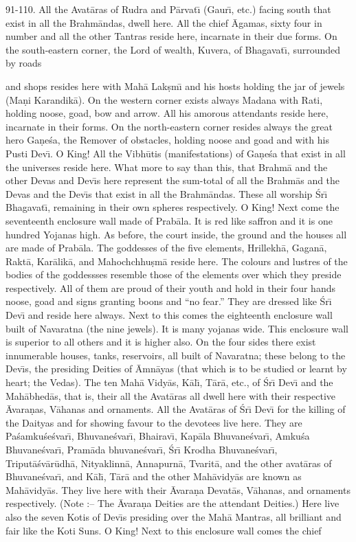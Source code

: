 91-110. All the Avat\=aras of Rudra and P\=arvat\={\i} (Gaur\={\i}, etc.) facing south that exist in all the Brahm\=andas, dwell here. All the chief \=Agamas, sixty four in number and all the other Tantras reside here, incarnate in their due forms. On the south-eastern corner, the Lord of wealth, Kuvera, of Bhagavat\={\i}, surrounded by roads

and shops resides here with Mah\=a Lak\d{s}m\={\i} and his hosts holding the jar of jewels (Ma\d{n}i Karandik\=a). On the western corner exists always Madana with Rati, holding noose, goad, bow and arrow. All his amorous attendants reside here, incarnate in their forms. On the north-eastern corner resides always the great hero Ga\d{n}e\'sa, the Remover of obstacles, holding noose and goad and with his Pusti Dev\={\i}. O King! All the Vibh\=utis (manifestations) of Ga\d{n}e\'sa that exist in all the universes reside here. What more to say than this, that Brahm\=a and the other Devas and Dev\={\i}s here represent the sum-total of all the Brahm\=as and the Devas and the Dev\={\i}s that exist in all the Brahm\=andas. These all worship \'Sr\={\i} Bhagavat\={\i}, remaining in their own spheres respectively. O King! Next come the seventeenth enclosure wall made of Prab\=ala. It is red like saffron and it is one hundred Yojanas high. As before, the court inside, the ground and the houses all are made of Prab\=ala. The goddesses of the five elements, Hrillekh\=a, Gagan\=a, Rakt\=a, Kar\=alik\=a, and Mahochchhu\d{s}m\=a reside here. The colours and lustres of the bodies of the goddessses resemble those of the elements over which they preside respectively. All of them are proud of their youth and hold in their four hands noose, goad and signs granting boons and ``no fear.'' They are dressed like \'Sr\={\i} Dev\={\i} and reside here always. Next to this comes the eighteenth enclosure wall built of Navaratna (the nine jewels). It is many yojanas wide. This enclosure wall is superior to all others and it is higher also. On the four sides there exist innumerable houses, tanks, reservoirs, all built of Navaratna; these belong to the Dev\={\i}s, the presiding Deities of \=Amn\=ayas (that which is to be studied or learnt by heart; the Vedas). The ten Mah\=a Vidy\=as, K\=al\={\i}, T\=ar\=a, etc., of \'Sr\={\i} Dev\={\i} and the Mah\=abhed\=as, that is, their all the Avat\=aras all dwell here with their respective \=Avara\d{n}as, V\=ahanas and ornaments. All the Avat\=aras of \'Sr\={\i} Dev\={\i} for the killing of the Daityas and for showing favour to the devotees live here. They are Pa\'samku\'se\'svar\={\i}, Bhuvane\'svar\={\i}, Bhairav\={\i}, Kap\=ala Bhuvane\'svar\={\i}, Amku\'sa Bhuvane\'svar\={\i}, Pram\=ada bhuvane\'svar\={\i}, \'Sr\={\i} Krodha Bhuvane\'svar\={\i}, Triput\=a\'sv\=ar\=udh\=a, Nityaklinn\=a, Annapurn\=a, Tvarit\=a, and the other avat\=aras of Bhuvane\'svar\={\i}, and K\=al\={\i}, T\=ar\=a and the other Mah\=avidy\=as are known as Mah\=avidy\=as. They live here with their \=Avara\d{n}a Devat\=as, V\=ahanas, and ornaments respectively. (Note :-- The \=Avara\d{n}a Deities are the attendant Deities.) Here live also the seven Kotis of Dev\={\i}s presiding over the Mah\=a Mantras, all brilliant and fair like the Koti Suns. O King! Next to this enclosure wall comes the chief 